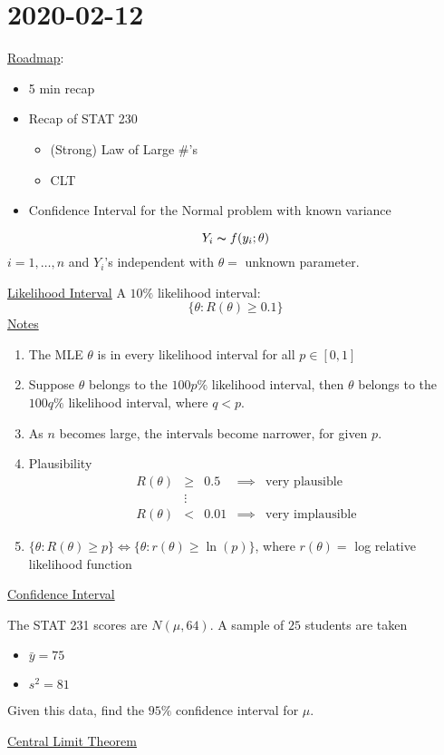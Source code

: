 \section{2020-02-12}
\underline{Roadmap}:
\begin{itemize}
    \item 5 min recap
    \item Recap of STAT 230
          \begin{itemize}
              \item (Strong) Law of Large \#'s
              \item CLT
          \end{itemize}
    \item Confidence Interval for the Normal problem with known variance
\end{itemize}
\[ Y_i \thicksim f(y_i;\theta) \]
$ i=1,\ldots ,n $ and $ Y_i $'s independent with $ \theta= $ unknown parameter.

\underline{Likelihood Interval}
A $ 10\% $ likelihood interval:
\[ \{\theta:R(\theta)\geqslant 0.1\} \]
\underline{Notes}
\begin{enumerate}[label=(\roman*)]
    \item The MLE $ \theta $ is in every likelihood interval for all $ p\in[0,1] $
    \item Suppose $ \theta $ belongs to the $ 100p\% $ likelihood interval, then
          $ \theta $ belongs to the $ 100q\% $ likelihood interval, where $ q<p $.
    \item As $ n $ becomes large, the intervals become narrower, for given $ p $.
    \item Plausibility
          \[ 
              \begin{array}{ccccc}
                  R(\theta) & \geqslant & 0.5  & \implies & \text{very plausible}   \\
                            & \vdots    &                                           \\
                  R(\theta) & <         & 0.01 & \implies & \text{very implausible}
              \end{array}
          \]
    \item $ \{\theta:R(\theta)\geqslant p\}\iff \{\theta:r(\theta)\geqslant \ln(p)\} $,
          where $ r(\theta) = $ log relative likelihood function
\end{enumerate}
\underline{Confidence Interval}
\begin{exbox}
    \begin{example}
        The STAT 231 scores are $ N(\mu,64) $. A sample of $ 25 $ students are
        taken
        \begin{itemize}
            \item $ \bar{y}=75 $
            \item $ s^2=81 $
        \end{itemize}
        Given this data, find the $ 95\% $ confidence interval for $ \mu $.
    \end{example}
\end{exbox}
\underline{Central Limit Theorem}

